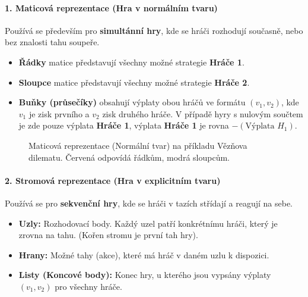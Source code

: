\paragraph*{1. Maticová reprezentace (Hra v normálním tvaru)}
Používá se především pro \textbf{simultánní hry}, kde se hráči rozhodují současně, nebo bez znalosti tahu soupeře.
\begin{itemize}
    \item \textbf{Řádky} matice představují všechny možné strategie \textbf{Hráče 1}.
    \item \textbf{Sloupce} matice představují všechny možné strategie \textbf{Hráče 2}.
    \item \textbf{Buňky (průsečíky)} obsahují výplaty obou hráčů ve formátu $(v_1, v_2)$, kde $v_1$ je zisk prvního a $v_2$ zisk druhého hráče.
    V případě hyry s nulovým součtem je zde pouze výplata \textbf{Hráče 1}, výplata \textbf{Hráče 1} je rovna $-(\text{Výplata }H_1)$.
\end{itemize}

\begin{figure}[htbp]
    \centering
    \caption{Maticová reprezentace (Normální tvar) na příkladu Vězňova dilematu. Červená odpovídá řádkům, modrá sloupcům.}
\end{figure}

\paragraph*{2. Stromová reprezentace (Hra v explicitním tvaru)}
Používá se pro \textbf{sekvenční hry}, kde se hráči v tazích střídají a reagují na sebe.
\begin{itemize}
    \item \textbf{Uzly:} Rozhodovací body. Každý uzel patří konkrétnímu hráči, který je zrovna na tahu. (Kořen stromu je první tah hry).
    \item \textbf{Hrany:} Možné tahy (akce), které má hráč v daném uzlu k dispozici.
    \item \textbf{Listy (Koncové body):} Konec hry, u kterého jsou vypsány výplaty $(v_1, v_2)$ pro všechny hráče.
\end{itemize}

